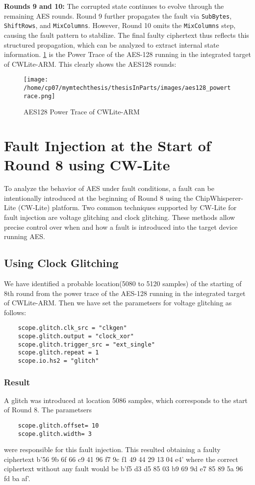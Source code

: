 \textbf{Rounds 9 and 10:}
The corrupted state continues to evolve through the remaining AES rounds. Round 9 further propagates the fault via \texttt{SubBytes}, \texttt{ShiftRows}, and \texttt{MixColumns}. However, Round 10 omits the \texttt{MixColumns} step, causing the fault pattern to stabilize. The final faulty ciphertext thus reflects this structured propagation, which can be analyzed to extract internal state information.
\ref{fig:powertrace} is the Power Trace of the AES-128 running in the integrated target of CWLite-ARM. This clearly shows the AES128 rounds:
\begin{figure}[h]
    \centering
    \texttt{[image: /home/cp07/mymtechthesis/thesisInParts/images/aes128\_powertrace.png]}
    \caption{AES128 Power Trace of CWLite-ARM}
    \label{fig:powertrace}
\end{figure}
\section{Fault Injection at the Start of Round 8 using CW-Lite}

To analyze the behavior of AES under fault conditions, a fault can be intentionally introduced at the beginning of Round 8 using the ChipWhisperer-Lite (CW-Lite) platform. Two common techniques supported by CW-Lite for fault injection are voltage glitching and clock glitching. These methods allow precise control over when and how a fault is introduced into the target device running AES.

\subsection{Using Clock Glitching}
We have identified a probable location(5080 to 5120 samples) of the starting of 8th round from the power trace of the AES-128 running in the integrated target of CWLite-ARM. Then we have set the parametsers for voltage glitching as follows:
\begin{verbatim}
    scope.glitch.clk_src = "clkgen"
    scope.glitch.output = "clock_xor"
    scope.glitch.trigger_src = "ext_single"
    scope.glitch.repeat = 1
    scope.io.hs2 = "glitch"
\end{verbatim}
\subsubsection{Result}
A glitch was introduced at location 5086 samples, which corresponds to the start of Round 8. The parametsers 
\begin{verbatim}
    scope.glitch.offset= 10
    scope.glitch.width= 3
\end{verbatim}
were responsible for this fault injection. This resulted obtaining a faulty ciphertext b'56 9b 6f 66 c9 41 96 f7 9c f1 49 44 29 13 04 e4' where the correct ciphertext without any fault would be b'f5 d3 d5 85 03 b9 69 9d e7 85 89 5a 96 fd ba af'.

